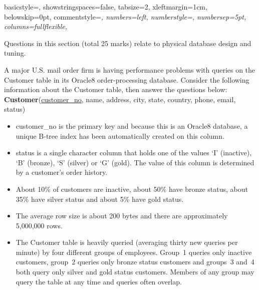 \documentclass{ouexam}
\begin{document}
\lstset%
{	basicstyle=\sffamily,
	showstringspaces=false,
	tabsize=2,
	xleftmargin=1cm,
	belowskip=0pt,
	commentstyle=\itshape,
	numbers=left,
	numberstyle=\scriptsize,
	numbersep=5pt,
	columns=fullflexible,
}

\maketitlepage


\begin{examsection}{25}{}{Questions in this section (total 25 marks) relate to
physical database design and tuning.}


\begin{question}{10}

	A major U.S. mail order firm is having performance problems with queries on
	the \textsf{Customer} table in its Oracle8 order-processing database.
	Consider the following information about the \textsf{Customer} table, then
	answer the questions below:	\\

	\textsf{\textbf{Customer}(\underline{customer\_no}, name, address, city,
	state, country, phone, email, status)}

	\begin{itemize}

		\item \textsf{customer\_no} is the primary key and because this is an
		Oracle8 database, a unique B-tree index has been automatically created
		on this column.

		\item \textsf{status} is a single character column that holds one of
		the values `I' (inactive), `B' (bronze), `S' (silver) or `G' (gold).
		The value of this column is determined by a customer's order history.

		\item About 10\% of customers are inactive, about 50\% have bronze
		status, about 35\% have silver status and about 5\% have gold status.

		\item The average row size is about 200 bytes and there are
		approximately 5,000,000 rows.

		\item The \textsf{Customer} table is heavily queried (averaging thirty
		new queries per minute) by four different groups of employees. Group~1
		queries only inactive customers, group~2 queries only bronze status
		customers and groups~3 and~4 both query only silver and gold status
		customers. Members of any group may query the table at any time and
		queries often overlap.


\end{itemize}
\end{question}
\end{examsection}
\end{document}
